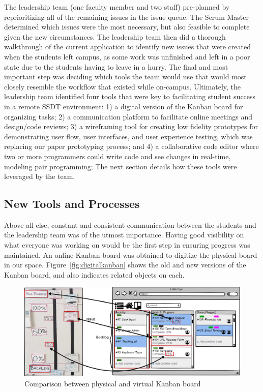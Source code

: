 The leadership team (one faculty member and two staff) pre-planned by reprioritizing all of the remaining issues in the issue queue. The Scrum Master determined which issues were the most necessary, but also feasible to complete given the new circumstances. The leadership team then did a thorough walkthrough of the current application to identify new issues that were created when the students left campus, as some work was unfinished and left in a poor state due to the students having to leave in a hurry. The final and most important step was deciding which tools the team would use that would most closely resemble the workflow that existed while on-campus.  Ultimately, the leadership team identified four tools that were key to facilitating student success in a remote SSDT environment: 1) a digital version of the Kanban board for organizing tasks; 2) a communication platform to facilitate online meetings and design/code reviews; 3) a wireframing tool for creating low fidelity prototypes for demonstrating user flow, user interfaces, and user experience testing, which was replacing our paper prototyping process; and 4) a collaborative code editor where two or more programmers could write code and see changes in real-time, modeling pair programming;  The next section details how these tools were leveraged by the team.

\subsection{New Tools and Processes}
Above all else, constant and consistent communication between the students and the leadership team was of the utmost importance. Having good visibility on what everyone was working on would be the first step in ensuring progress was maintained. An online Kanban board was obtained to digitize the physical board in our space. Figure~\ref{fig:digitalkanban} shows the old and new versions of the Kanban board, and also indicates related objects on each.

\begin{figure}[h]
 \centering
 \includegraphics[width=\linewidth]{newTrellomockup2.png}
 \caption{Comparison between physical and virtual Kanban board}
 \label{kanban}
\end{figure}

